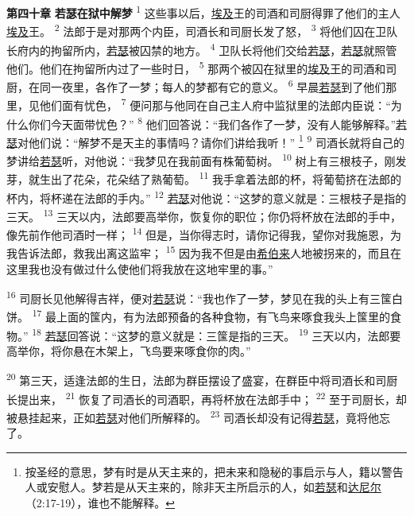 \textbf{第四十章 }
\textbf{若瑟在狱中解梦 }
\textsuperscript{1}
这些事以后，\uline{埃及}王的司酒和司厨得罪了他们的主人\uline{埃及}王。
\textsuperscript{2}
法郎于是对那两个内臣，司酒长和司厨长发了怒，
\textsuperscript{3}
将他们囚在卫队长府内的拘留所内，\uline{若瑟}被囚禁的地方。
\textsuperscript{4}
卫队长将他们交给\uline{若瑟}，\uline{若瑟}就照管他们。他们在拘留所内过了一些时日，
\textsuperscript{5}
那两个被囚在狱里的\uline{埃及}王的司酒和司厨，在同一夜里，各作了一梦；每人的梦都有它的意义。
\textsuperscript{6}
早晨\uline{若瑟}到了他们那里，见他们面有忧色，
\textsuperscript{7}
便问那与他同在自己主人府中监狱里的法郎内臣说：“为什么你们今天面带忧色？”
\textsuperscript{8}
他们回答说：“我们各作了一梦，没有人能够解释。”\uline{若瑟}对他们说：“解梦不是天主的事情吗？请你们讲给我听！”
\footnote{按圣经的意思，梦有时是从天主来的，把未来和隐秘的事启示与人，籍以警告人或安慰人。梦若是从天主来的，除非天主所启示的人，如\uline{若瑟}和\uline{达尼尔}（2:17-19），谁也不能解释。}
\textsuperscript{9}
司酒长就将自己的梦讲给\uline{若瑟}听，对他说：“我梦见在我前面有株葡萄树。
\textsuperscript{10}
树上有三根枝子，刚发芽，就生出了花朵，花朵结了熟葡萄。
\textsuperscript{11}
我手拿着法郎的杯，将葡萄挤在法郎的杯内，将杯递在法郎的手内。”
\textsuperscript{12}
\uline{若瑟}对他说：“这梦的意义就是：三根枝子是指的三天。
\textsuperscript{13}
三天以内，法郎要高举你，恢复你的职位；你仍将杯放在法郎的手中，像先前作他司酒时一样；
\textsuperscript{14}
但是，当你得志时，请你记得我，望你对我施恩，为我告诉法郎，救我出离这监牢；
\textsuperscript{15}
因为我不但是由\uline{希伯来}人地被拐来的，而且在这里我也没有做过什么使他们将我放在这地牢里的事。”

\textsuperscript{16}
司厨长见他解得吉祥，便对\uline{若瑟}说：“我也作了一梦，梦见在我的头上有三筺白饼。
\textsuperscript{17}
最上面的筺内，有为法郎预备的各种食物，有飞鸟来啄食我头上筺里的食物。”
\textsuperscript{18}
\uline{若瑟}回答说：“这梦的意义就是：三筺是指的三天。
\textsuperscript{19}
三天以内，法郎要高举你，将你悬在木架上，飞鸟要来啄食你的肉。”

\textsuperscript{20}
第三天，适逢法郎的生日，法郎为群臣摆设了盛宴，在群臣中将司酒长和司厨长提出来，
\textsuperscript{21}
恢复了司酒长的司酒职，再将杯放在法郎手中；
\textsuperscript{22}
至于司厨长，却被悬挂起来，正如\uline{若瑟}对他们所解释的。
\textsuperscript{23}
司酒长却没有记得\uline{若瑟}，竟将他忘了。

